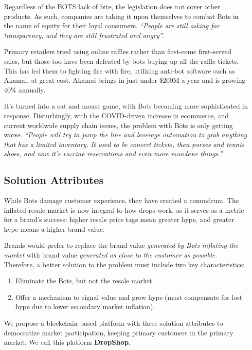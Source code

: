 \documentclass[runningheads]{llncs}
\begin{document}
Regardless of the BOTS lack of bite, the legislation does not cover other products.  As such, companies are taking it upon themselves to combat Bots in the name of equity for their loyal consumers.  \emph{“People are still asking for transparency, and they are still frustrated and angry”.}\cite{3}

Primary retailers tried using online raffles rather than first-come first-served sales, but those too have been defeated by bots buying up all the raffle tickets.  This has led them to fighting fire with fire, utilizing anti-bot software such as Akamai, at great cost.  Akamai brings in just under \$200M a year and is growing 40\% annually.\cite{3}

It’s turned into a cat and mouse game, with Bots becoming more sophisticated in response.  Disturbingly, with the COVID-driven increase in ecommerce, and current worldwide supply chain issues, the problem with Bots is only getting worse. \emph{“People will try to jump the line and leverage automation to grab anything that has a limited inventory.  It used to be concert tickets, then purses and tennis shoes, and now it’s vaccine reservations and even more mundane things.”}\cite{3}

\subsection{Solution Attributes} 
While Bots damage customer experience, they have created a conundrum.  The inflated resale market is now integral to how drops work, as it serves as a metric for a brand’s success: higher resale price tags mean greater hype, and greater hype means a higher brand value.\cite{5}
	
Brands would prefer to replace the brand value \emph{generated by Bots inflating the market} with brand value \emph{generated as close to the customer as possible.}  Therefore, a better solution to the problem must include two key characteristics:
\begin{enumerate}
\item Eliminate the Bots, but not the resale market
\item Offer a mechanism to signal value and grow hype (must compensate for lost hype due to lower secondary market inflation).
\end{enumerate}

We propose a blockchain based platform with these solution attributes to democratize market participation, keeping primary customers in the primary market.  We call this platform \textbf{DropShop}.
\end{document}
